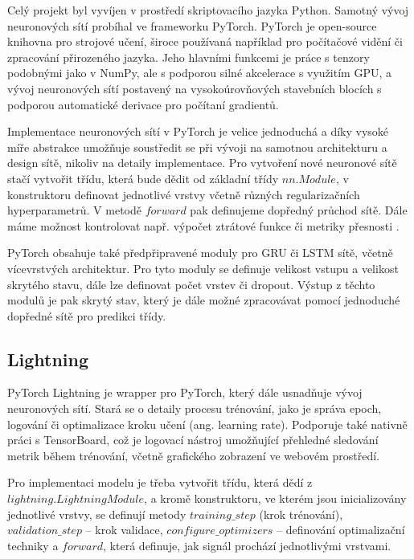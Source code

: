 Celý projekt byl vyvíjen v prostředí skriptovacího jazyka Python. Samotný vývoj
neuronových sítí probíhal ve frameworku PyTorch. PyTorch je open-source
knihovna pro strojové učení, široce používaná například pro počítačové vidění
či zpracování přirozeného jazyka. Jeho hlavními funkcemi je práce s tenzory
podobnými jako v NumPy, ale s podporou silné akcelerace s využitím GPU, a vývoj
neuronových sítí postavený na vysokoúrovňových stavebních blocích s podporou
automatické derivace pro počítaní gradientů.

Implementace neuronových sítí v PyTorch je velice jednoduchá a díky vysoké míře
abstrakce umožňuje soustředit se při vývoji na samotnou architekturu a design
sítě, nikoliv na detaily implementace. Pro vytvoření nové neuronové sítě stačí
vytvořit třídu, která bude dědit od základní třídy $nn.Module$, v konstruktoru
definovat jednotlivé vrstvy včetně různých regularizačních hyperparametrů. V
metodě $forward$ pak definujeme dopředný průchod sítě. Dále máme možnost
kontrolovat např. výpočet ztrátové funkce či metriky přesnosti
\cite{pytorchdocs}.

PyTorch obsahuje také předpřipravené moduly pro GRU či LSTM sítě, včetně
vícevrstvých architektur. Pro tyto moduly se definuje velikost vstupu a
velikost skrytého stavu, dále lze definovat počet vrstev či dropout. Výstup z
těchto modulů je pak skrytý stav, který je dále možné zpracovávat pomocí
jednoduché dopředné sítě pro predikci třídy.

\subsection{Lightning}
\label{sec:Lightning}

PyTorch Lightning je wrapper pro PyTorch, který dále usnadňuje vývoj
neuronových sítí. Stará se o detaily procesu trénování, jako je správa epoch,
logování či optimalizace kroku učení (ang. learning rate). Podporuje také
nativně práci s TensorBoard, což je logovací nástroj umožňující přehledné
sledování metrik během trénování, včetně grafického zobrazení ve webovém
prostředí.

Pro implementaci modelu je třeba vytvořit třídu, která dědí z
$lightning.LightningModule$, a kromě konstruktoru, ve kterém jsou
inicializovány jednotlivé vrstvy, se definují metody $training\_step$ (krok
trénování), $validation\_step$ – krok validace, $configure\_optimizers$ –
definování optimalizační techniky a $forward$, která definuje, jak signál
prochází jednotlivými vrstvami.


